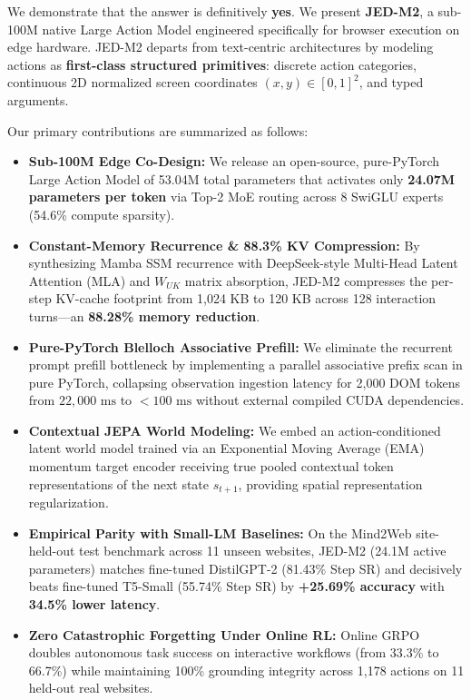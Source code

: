 \documentclass[10pt,twocolumn,letterpaper]{article}
\begin{document}
We demonstrate that the answer is definitively \textbf{yes}. We present \textbf{JED-M2}, a sub-100M native Large Action Model engineered specifically for browser execution on edge hardware. JED-M2 departs from text-centric architectures by modeling actions as \textbf{first-class structured primitives}: discrete action categories, continuous 2D normalized screen coordinates $(x, y) \in [0, 1]^2$, and typed arguments.

Our primary contributions are summarized as follows:
\begin{itemize}[leftmargin=*]
    \item \textbf{Sub-100M Edge Co-Design:} We release an open-source, pure-PyTorch Large Action Model of 53.04M total parameters that activates only \textbf{24.07M parameters per token} via Top-2 MoE routing across 8 SwiGLU experts (54.6\% compute sparsity).
    \item \textbf{Constant-Memory Recurrence \& 88.3\% KV Compression:} By synthesizing Mamba SSM recurrence with DeepSeek-style Multi-Head Latent Attention (MLA) and $W_{UK}$ matrix absorption, JED-M2 compresses the per-step KV-cache footprint from 1,024 KB to 120 KB across 128 interaction turns---an \textbf{88.28\% memory reduction}.
    \item \textbf{Pure-PyTorch Blelloch Associative Prefill:} We eliminate the recurrent prompt prefill bottleneck by implementing a parallel associative prefix scan in pure PyTorch, collapsing observation ingestion latency for 2,000 DOM tokens from $22{,}000\text{ ms}$ to \textbf{$< 100\text{ ms}$} without external compiled CUDA dependencies.
    \item \textbf{Contextual JEPA World Modeling:} We embed an action-conditioned latent world model trained via an Exponential Moving Average (EMA) momentum target encoder receiving true pooled contextual token representations of the next state $s_{t+1}$, providing spatial representation regularization.
    \item \textbf{Empirical Parity with Small-LM Baselines:} On the Mind2Web site-held-out test benchmark across 11 unseen websites, JED-M2 (24.1M active parameters) matches fine-tuned DistilGPT-2 (81.43\% Step SR) and decisively beats fine-tuned T5-Small (55.74\% Step SR) by \textbf{+25.69\% accuracy} with \textbf{34.5\% lower latency}.
    \item \textbf{Zero Catastrophic Forgetting Under Online RL:} Online GRPO doubles autonomous task success on interactive workflows (from 33.3\% to 66.7\%) while maintaining 100\% grounding integrity across 1,178 actions on 11 held-out real websites.
\end{itemize}
\end{document}
